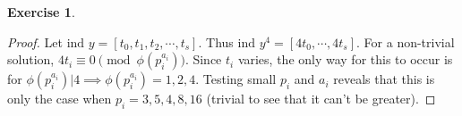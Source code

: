 \documentclass[11pt]{article}
\theoremstyle{definition}
\newtheorem{exercise}{{Exercise}}
\newcommand{\ind}{\text{ind }}
\begin{document}
\begin{exercise}
	\begin{proof}
		Let \(\ind y = [t_0, t_1, t_2, \cdots , t_s] \). Thus \(\ind y^4 = [4t_0, \cdots, 4t_s] \). For a non-trivial solution, \(4t_i \equiv 0 \pmod{\phi(p_i^{a_i})} \). Since \(t_i \) varies, the only way for this to occur is for \(\phi(p_i^{a_i})|4 \implies \phi(p_i^{a_i}) = 1,2,4 \). Testing small \(p_i \) and \(a_i \) reveals that this is only the case when \(p_i=3,5,4,8,16 \) (trivial to see that it can't be greater).
	\end{proof}
\end{exercise}
\end{document}
